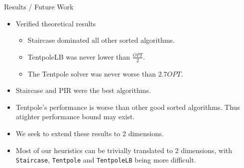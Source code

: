 \documentclass[compress,table]{beamer}
\begin{document}
\begin{frame}[t]{Results / Future Work}

\begin{itemize}
\item Verified theoretical results
\begin{itemize}
\item Staircase dominated all other sorted algorithms.
\item TentpoleLB was never lower than $\frac{OPT}{2}$.
\item The Tentpole solver was never worse than $2.7OPT$.
\end{itemize}

\item Staircase and PIR were the best algorithms.
\item Tentpole's performance is worse than other good sorted algorithms.  Thus atighter performance bound may exist.

\item We seek to extend these results to 2 dimensions.

\item Most of our heuristics can be trivially translated to 2 dimensions, with \texttt{Staircase}, \texttt{Tentpole} and \texttt{TentpoleLB} being more difficult. 

\end{itemize}

\end{frame}
\end{document}
